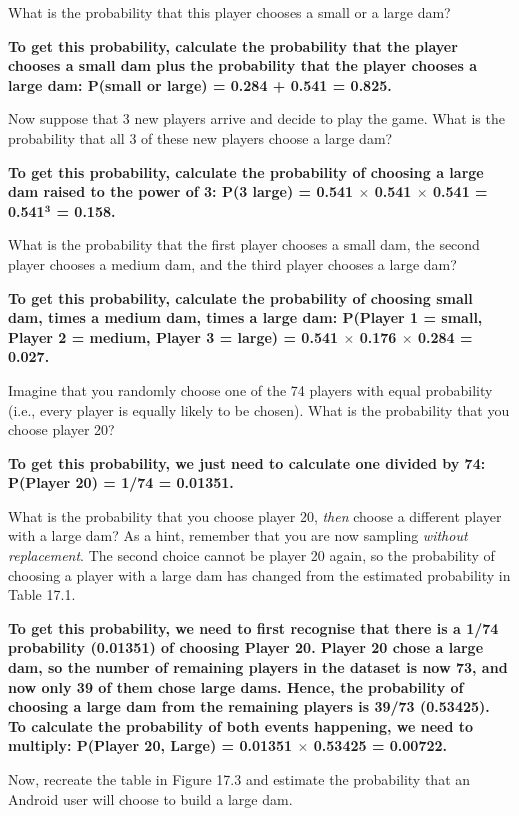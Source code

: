 \documentclass[
  openany]{krantz}
\begin{document}
What is the probability that this player chooses a small or a large dam?

\textbf{To get this probability, calculate the probability that the player chooses a small dam plus the probability that the player chooses a large dam: P(small or large) = 0.284 + 0.541 = 0.825.}

Now suppose that 3 new players arrive and decide to play the game. What is the probability that all 3 of these new players choose a large dam?

\textbf{To get this probability, calculate the probability of choosing a large dam raised to the power of 3: P(3 large) = 0.541 \(\times\) 0.541 \(\times\) 0.541 = 0.541\(\mathbf{^{3}}\) = 0.158.}

What is the probability that the first player chooses a small dam, the second player chooses a medium dam, and the third player chooses a large dam?

\textbf{To get this probability, calculate the probability of choosing small dam, times a medium dam, times a large dam: P(Player 1 = small, Player 2 = medium, Player 3 = large) = 0.541 \(\times\) 0.176 \(\times\) 0.284 = 0.027.}

Imagine that you randomly choose one of the 74 players with equal probability (i.e., every player is equally likely to be chosen). What is the probability that you choose player 20?

\textbf{To get this probability, we just need to calculate one divided by 74: P(Player 20) = 1/74 = 0.01351.}

What is the probability that you choose player 20, \emph{then} choose a different player with a large dam? As a hint, remember that you are now sampling \emph{without replacement}. The second choice cannot be player 20 again, so the probability of choosing a player with a large dam has changed from the estimated probability in Table 17.1.

\textbf{To get this probability, we need to first recognise that there is a 1/74 probability (0.01351) of choosing Player 20. Player 20 chose a large dam, so the number of remaining players in the dataset is now 73, and now only 39 of them chose large dams. Hence, the probability of choosing a large dam from the remaining players is 39/73 (0.53425). To calculate the probability of both events happening, we need to multiply: P(Player 20, Large) = 0.01351 \(\times\) 0.53425 = 0.00722.}

Now, recreate the table in Figure 17.3 and estimate the probability that an Android user will choose to build a large dam.
\end{document}
